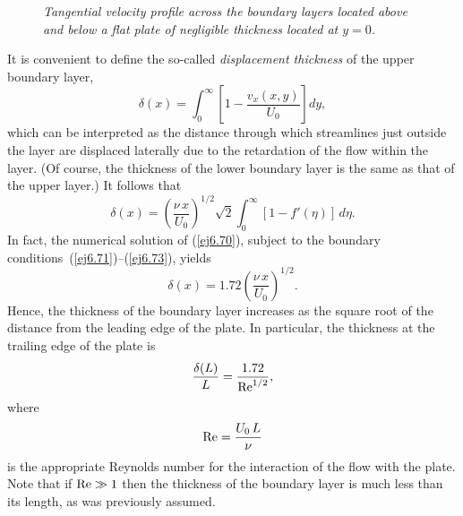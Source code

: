 \begin{figure}
\epsfysize=3.25in
\centerline{}
\caption{\em Tangential velocity profile across the boundary layers located above and below a flat plate of negligible
thickness located at $y=0$. }\label{fvx}
\end{figure}

It is convenient to define the so-called {\em displacement thickness}\/ of the upper boundary layer, 
\begin{equation}\label{ej6.75}
\delta(x) = \int_0^\infty \left[1-\frac{v_x(x,y)}{U_0}\right]dy,
\end{equation}
which can be interpreted as the distance through which streamlines just outside the  layer
are displaced laterally due to the retardation of the flow within the layer. (Of course, the thickness of the
lower boundary layer is the same as that of the upper layer.)
It follows that
\begin{equation}
\delta(x) = \left(\frac{\nu\,x}{U_0}\right)^{1/2}\sqrt{2}\int_0^\infty [1-f'(\eta)]\,d\eta.
\end{equation}
In fact, the numerical solution of (\ref{ej6.70}), subject to the boundary conditions~(\ref{ej6.71})--(\ref{ej6.73}),  yields
\begin{equation}\label{ej6.76}
\delta(x) = 1.72\left(\frac{\nu\,x}{U_0}\right)^{1/2}.
\end{equation}
Hence, the thickness of the boundary layer increases as the square root of the distance from the leading edge of the plate. 
In particular, the thickness at the trailing edge of the plate is
\begin{equation}\label{ej6.77}
\frac{\delta(L)}{L} = \frac{1.72}{{\rm Re}^{1/2}},
\end{equation}
where
\begin{equation}
{\rm Re} = \frac{U_0\,L}{\nu}
\end{equation}
is the appropriate Reynolds number for the interaction of the flow with the plate. Note that if ${\rm Re}\gg 1$ then the
thickness of the boundary layer is much less than its length, as was previously assumed. 

